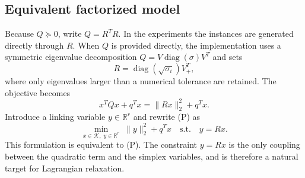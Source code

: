 \documentclass[12pt]{article}
\newcommand{\R}{\mathbb{R}}
\newcommand{\Kset}{\mathcal{K}}
\begin{document}
\subsection{Equivalent factorized model}
Because $Q\succeq0$, write $Q=R^TR$.  In the experiments the instances are generated directly through $R$.  When \(Q\) is provided directly, the implementation uses a symmetric
eigenvalue decomposition $Q=V\operatorname{diag}(\sigma)V^T$ and sets
\begin{equation}
R=\operatorname{diag}(\sqrt{\sigma_i})V_+^T,
\label{eq:psd-factorization}
\end{equation}
where only eigenvalues larger than a numerical tolerance are retained.  The objective becomes
\begin{equation}
 x^TQx+q^Tx=\|Rx\|_2^2+q^Tx.
\end{equation}
Introduce a linking variable $y\in\R^r$ and rewrite (P) as
\begin{equation}
\tag{P$_R$}
\min_{x\in\Kset,\;y\in\R^r}\; \|y\|_2^2+q^Tx
\quad\text{s.t.}\quad y=Rx.
\end{equation}
This formulation is equivalent to (P).  The constraint $y=Rx$ is the only coupling between the quadratic term and the simplex variables, and is therefore a natural target for Lagrangian relaxation.
\end{document}
